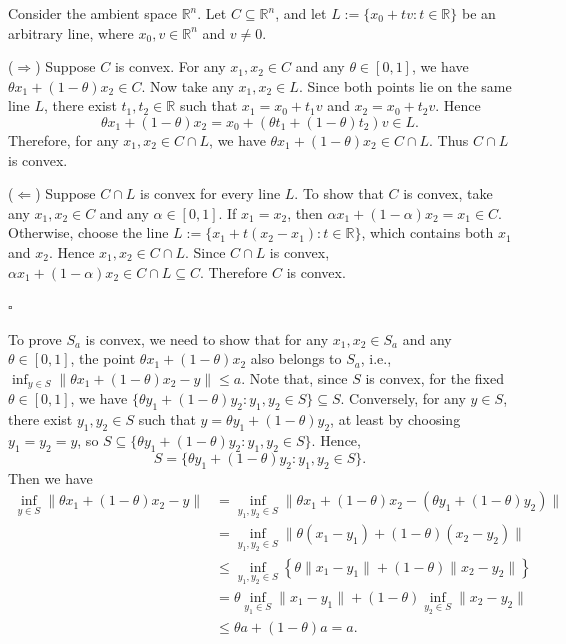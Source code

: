 \documentclass[12pt,a4paper]{article}
\begin{document}
\begin{problem}
Consider the ambient space \(\mathbb{R}^n\). Let \(C\subseteq\mathbb{R}^n\), and let \(L:=\{x_0+tv:t\in\mathbb{R}\}\) be an arbitrary line, where \(x_0,v\in\mathbb{R}^n\) and \(v\neq0\).

(\(\Rightarrow\)) Suppose \(C\) is convex. For any \(x_1,x_2\in C\) and any \(\theta\in[0,1]\), we have \(\theta x_1+(1-\theta)x_2\in C\). Now take any \(x_1,x_2\in L\). Since both points lie on the same line \(L\), there exist \(t_1,t_2\in\mathbb{R}\) such that \(x_1=x_0+t_1v\) and \(x_2=x_0+t_2v\). Hence
\[
\theta x_1+(1-\theta)x_2=x_0+(\theta t_1+(1-\theta)t_2)v\in L.
\]
Therefore, for any \(x_1,x_2\in C\cap L\), we have \(\theta x_1+(1-\theta)x_2\in C\cap L\). Thus \(C\cap L\) is convex.

(\(\Leftarrow\)) Suppose \(C\cap L\) is convex for every line \(L\). To show that \(C\) is convex, take any \(x_1,x_2\in C\) and any \(\alpha\in[0,1]\). If \(x_1=x_2\), then \(\alpha x_1+(1-\alpha)x_2=x_1\in C\). Otherwise, choose the line \(L:=\{x_1+t(x_2-x_1):t\in\mathbb{R}\}\), which contains both \(x_1\) and \(x_2\). Hence \(x_1,x_2\in C\cap L\). Since \(C\cap L\) is convex, \(\alpha x_1+(1-\alpha)x_2\in C\cap L\subseteq C\). Therefore \(C\) is convex.

$\square$
\end{problem}

\begin{problem}
    To prove $S_a$ is convex, we need to show that for any $x_1,x_2\in S_a$ and any $\theta\in[0,1]$, the point $\theta x_1+(1-\theta)x_2$ also belongs to $S_a$, i.e., $\inf_{y\in S} \| \theta x_1+(1-\theta)x_2-y\| \le a$. Note that, since $S$ is convex, for the fixed $\theta\in[0,1]$, we have $\{\theta y_1+(1-\theta)y_2:y_1,y_2\in S\}\subseteq S$. Conversely, for any $y\in S$, there exist $y_1,y_2\in S$ such that $y=\theta y_1+(1-\theta)y_2$, at least by choosing $y_1=y_2=y$, so $S \subseteq \{\theta y_1+(1-\theta)y_2:y_1,y_2\in S\}$. Hence,
    \[
    S = \{\theta y_1+(1-\theta)y_2:y_1,y_2\in S\}.
    \]
    Then we have
    \begin{align*}
        \inf_{y\in S} \| \theta x_1+(1-\theta)x_2-y\| &= \inf_{y_1,y_2\in S} \| \theta x_1+(1-\theta)x_2-(\theta y_1+(1-\theta)y_2)\| \\
        &= \inf_{y_1,y_2\in S} \| \theta (x_1-y_1)+(1-\theta)(x_2-y_2)\| \\
        &\le \inf_{y_1,y_2\in S} \left\{ \theta \|x_1-y_1\|+(1-\theta)\|x_2-y_2\| \right\} \\
        &= \theta \inf_{y_1\in S} \|x_1-y_1\|+(1-\theta) \inf_{y_2\in S} \|x_2-y_2\| \\
        &\le \theta a+(1-\theta)a = a.
    \end{align*}

    
\end{problem}
\end{document}

